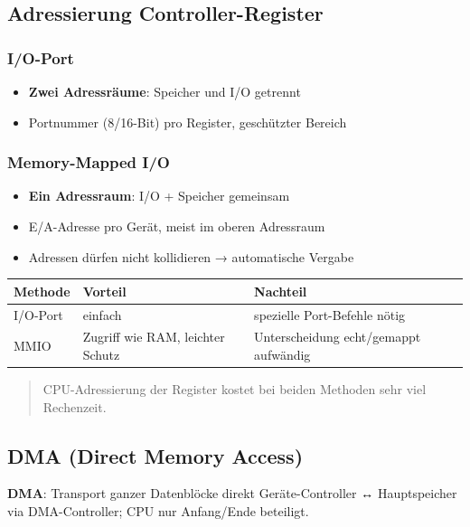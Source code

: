 \documentclass[11pt, a4paper]{article}
\begin{document}
\subsection{Adressierung Controller-Register}


\subsubsection{I/O-Port}
\begin{itemize}
  \item \textbf{Zwei Adressräume}: Speicher und I/O getrennt
  \item Portnummer (8/16-Bit) pro Register, geschützter Bereich
\end{itemize}


\subsubsection{Memory-Mapped I/O}
\begin{itemize}
  \item \textbf{Ein Adressraum}: I/O + Speicher gemeinsam
  \item E/A-Adresse pro Gerät, meist im oberen Adressraum
  \item Adressen dürfen nicht kollidieren → automatische Vergabe
\end{itemize}


{\small
\begin{tabularx}{\linewidth}{XXX}
\hline
\rowcolor{tableheadbg}
{\color{white}\textbf{Methode}} & {\color{white}\textbf{Vorteil}} & {\color{white}\textbf{Nachteil}} \\[2pt]
\hline
\endhead
\hline
\endfoot
I/O-Port & einfach & spezielle Port-Befehle nötig \\
MMIO & Zugriff wie RAM, leichter Schutz & Unterscheidung echt/gemappt aufwändig \\
\end{tabularx}
}


\begin{quote}
CPU-Adressierung der Register kostet bei beiden Methoden sehr viel Rechenzeit.
\end{quote}


\subsection{DMA (Direct Memory Access)}

\textbf{DMA}: Transport ganzer Datenblöcke direkt Geräte-Controller ↔ Hauptspeicher via DMA-Controller; CPU nur Anfang/Ende beteiligt.
\end{document}
